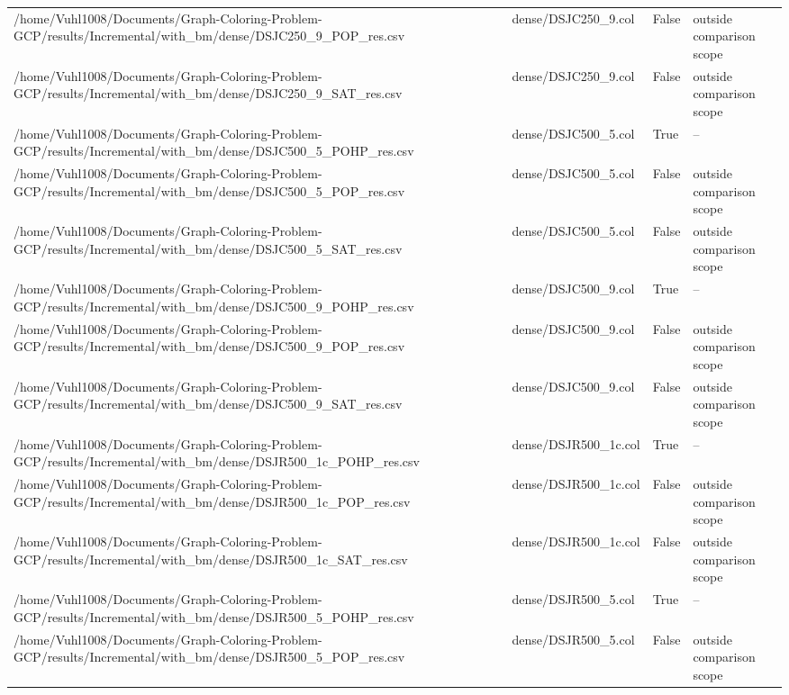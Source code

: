 \begin{table}[htbp]
\begin{tabular}{llll}
/home/Vuhl1008/Documents/Graph-Coloring-Problem-GCP/results/Incremental/with\_bm/dense/DSJC250\_9\_POP\_res.csv & dense/DSJC250\_9.col & False & outside comparison scope \\
/home/Vuhl1008/Documents/Graph-Coloring-Problem-GCP/results/Incremental/with\_bm/dense/DSJC250\_9\_SAT\_res.csv & dense/DSJC250\_9.col & False & outside comparison scope \\
/home/Vuhl1008/Documents/Graph-Coloring-Problem-GCP/results/Incremental/with\_bm/dense/DSJC500\_5\_POHP\_res.csv & dense/DSJC500\_5.col & True & -- \\
/home/Vuhl1008/Documents/Graph-Coloring-Problem-GCP/results/Incremental/with\_bm/dense/DSJC500\_5\_POP\_res.csv & dense/DSJC500\_5.col & False & outside comparison scope \\
/home/Vuhl1008/Documents/Graph-Coloring-Problem-GCP/results/Incremental/with\_bm/dense/DSJC500\_5\_SAT\_res.csv & dense/DSJC500\_5.col & False & outside comparison scope \\
/home/Vuhl1008/Documents/Graph-Coloring-Problem-GCP/results/Incremental/with\_bm/dense/DSJC500\_9\_POHP\_res.csv & dense/DSJC500\_9.col & True & -- \\
/home/Vuhl1008/Documents/Graph-Coloring-Problem-GCP/results/Incremental/with\_bm/dense/DSJC500\_9\_POP\_res.csv & dense/DSJC500\_9.col & False & outside comparison scope \\
/home/Vuhl1008/Documents/Graph-Coloring-Problem-GCP/results/Incremental/with\_bm/dense/DSJC500\_9\_SAT\_res.csv & dense/DSJC500\_9.col & False & outside comparison scope \\
/home/Vuhl1008/Documents/Graph-Coloring-Problem-GCP/results/Incremental/with\_bm/dense/DSJR500\_1c\_POHP\_res.csv & dense/DSJR500\_1c.col & True & -- \\
/home/Vuhl1008/Documents/Graph-Coloring-Problem-GCP/results/Incremental/with\_bm/dense/DSJR500\_1c\_POP\_res.csv & dense/DSJR500\_1c.col & False & outside comparison scope \\
/home/Vuhl1008/Documents/Graph-Coloring-Problem-GCP/results/Incremental/with\_bm/dense/DSJR500\_1c\_SAT\_res.csv & dense/DSJR500\_1c.col & False & outside comparison scope \\
/home/Vuhl1008/Documents/Graph-Coloring-Problem-GCP/results/Incremental/with\_bm/dense/DSJR500\_5\_POHP\_res.csv & dense/DSJR500\_5.col & True & -- \\
/home/Vuhl1008/Documents/Graph-Coloring-Problem-GCP/results/Incremental/with\_bm/dense/DSJR500\_5\_POP\_res.csv & dense/DSJR500\_5.col & False & outside comparison scope \\

\end{tabular}
\end{table}
